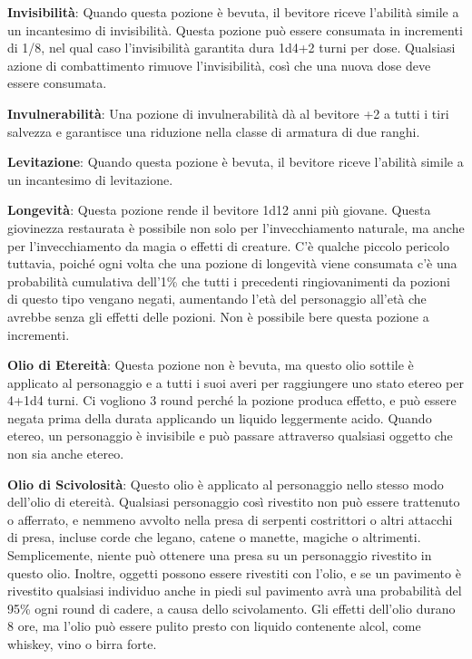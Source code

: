 \documentclass{article}
\begin{document}
\begin{multicols}{2}
\begin{table}[h]
\end{table}

\textbf{Invisibilità}: Quando questa pozione è bevuta, il bevitore riceve l'abilità simile a un incantesimo di invisibilità. Questa pozione può essere consumata in incrementi di 1/8, nel qual caso l'invisibilità garantita dura 1d4+2 turni per dose. Qualsiasi azione di combattimento rimuove l'invisibilità, così che una nuova dose deve essere consumata.

\textbf{Invulnerabilità}: Una pozione di invulnerabilità dà al bevitore +2 a tutti i tiri salvezza e garantisce una riduzione nella classe di armatura di due ranghi.

\textbf{Levitazione}: Quando questa pozione è bevuta, il bevitore riceve l'abilità simile a un incantesimo di levitazione.

\textbf{Longevità}: Questa pozione rende il bevitore 1d12 anni più giovane. Questa giovinezza restaurata è possibile non solo per l'invecchiamento naturale, ma anche per l'invecchiamento da magia o effetti di creature. C'è qualche piccolo pericolo tuttavia, poiché ogni volta che una pozione di longevità viene consumata c'è una probabilità cumulativa dell'1\% che tutti i precedenti ringiovanimenti da pozioni di questo tipo vengano negati, aumentando l'età del personaggio all'età che avrebbe senza gli effetti delle pozioni. Non è possibile bere questa pozione a incrementi.

\textbf{Olio di Etereità}: Questa pozione non è bevuta, ma questo olio sottile è applicato al personaggio e a tutti i suoi averi per raggiungere uno stato etereo per 4+1d4 turni. Ci vogliono 3 round perché la pozione produca effetto, e può essere negata prima della durata applicando un liquido leggermente acido. Quando etereo, un personaggio è invisibile e può passare attraverso qualsiasi oggetto che non sia anche etereo.

\textbf{Olio di Scivolosità}: Questo olio è applicato al personaggio nello stesso modo dell'olio di etereità. Qualsiasi personaggio così rivestito non può essere trattenuto o afferrato, e nemmeno avvolto nella presa di serpenti costrittori o altri attacchi di presa, incluse corde che legano, catene o manette, magiche o altrimenti. Semplicemente, niente può ottenere una presa su un personaggio rivestito in questo olio. Inoltre, oggetti possono essere rivestiti con l'olio, e se un pavimento è rivestito qualsiasi individuo anche in piedi sul pavimento avrà una probabilità del 95\% ogni round di cadere, a causa dello scivolamento. Gli effetti dell'olio durano 8 ore, ma l'olio può essere pulito presto con liquido contenente alcol, come whiskey, vino o birra forte.


\end{multicols}
\end{document}
